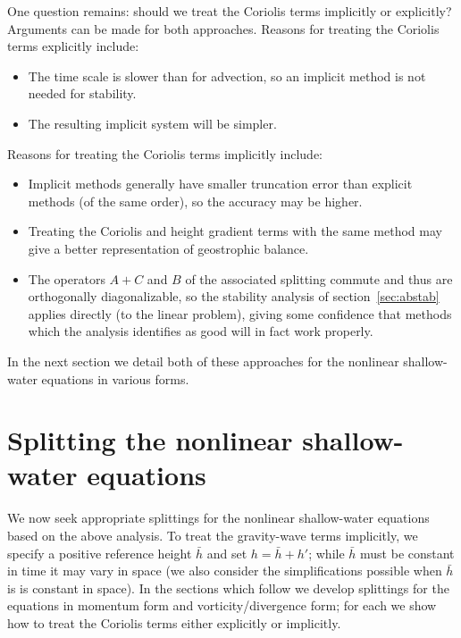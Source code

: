 \documentclass[12pt]{article}
\newcommand{\href}{\bar{h}}
\begin{document}
One question remains:  should we treat the Coriolis terms implicitly or
explicitly?  Arguments can be made for both approaches.  
Reasons for treating the Coriolis terms explicitly include:
\begin{itemize}
\setlength{\itemsep}{1pt} \setlength{\parsep}{0pt}
\setlength{\topsep}{0pt} \setlength{\partopsep}{0pt}
\item The time scale is slower than for advection, so an implicit method 
is not needed for stability.
\item The resulting implicit system will be simpler.
\end{itemize}
Reasons for treating the Coriolis terms implicitly include:
\begin{itemize}
\setlength{\itemsep}{1pt} \setlength{\parsep}{0pt}
\setlength{\topsep}{0pt} \setlength{\partopsep}{0pt}
\item Implicit methods generally have smaller truncation error than explicit
methods (of the same order), so the accuracy may be higher.
\item Treating the Coriolis and height gradient terms with the same method may
give a better representation of geostrophic balance. 
\item The operators $A+C$ and  $B$ of the associated splitting commute and
thus are orthogonally diagonalizable, so the stability analysis of
section~\ref{sec:abstab} applies directly (to the linear problem), giving some
confidence that methods which the analysis identifies as good will in fact
work properly.  
\end{itemize}
In the next section we detail both of these approaches for the nonlinear
shallow-water equations in various forms.

\pagebreak[4]
\section{Splitting the nonlinear shallow-water
equations\label{sec:splitting}}
\setcounter{equation}{0}

We now seek appropriate splittings for the nonlinear shallow-water equations
based on the above analysis.  To treat the gravity-wave terms implicitly, we
specify a positive reference height $\href$ and set $h=\href+h'$; while
$\href$ must be constant in time it may vary in space (we also consider the
simplifications possible when $\href$ is is constant in space).  In the
sections which follow we develop splittings for the equations in momentum form
and vorticity/divergence form; for each we show how to treat the Coriolis
terms either explicitly or implicitly.
\end{document}
